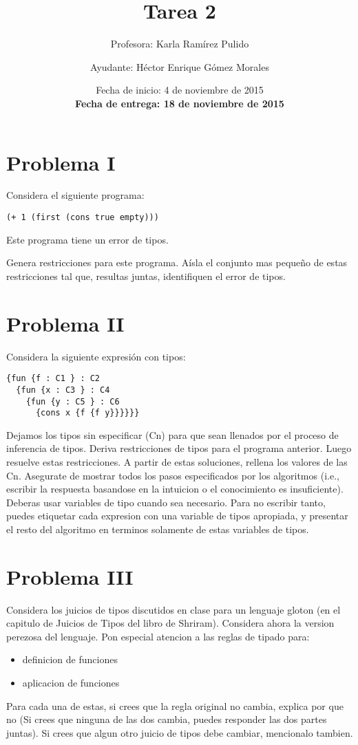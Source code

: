\documentclass{article}
\author{Profesora: Karla Ramírez Pulido \and
  Ayudante: Héctor Enrique Gómez Morales}
\title{Tarea 2}
\date{Fecha de inicio: 4 de noviembre de 2015\\
  \textbf{Fecha de entrega: 18 de noviembre de 2015}}
\begin{document}
\maketitle
\section*{Problema I}
Considera el siguiente programa:

\begin{verbatim}
(+ 1 (first (cons true empty)))
\end{verbatim}

Este programa tiene un error de tipos.

Genera restricciones para este programa. Aísla el conjunto mas pequeño de
estas restricciones tal que, resultas juntas, identifiquen el error de tipos.

\section*{Problema II}
Considera la siguiente expresión con tipos:

\begin{verbatim}
{fun {f : C1 } : C2
  {fun {x : C3 } : C4
    {fun {y : C5 } : C6
      {cons x {f {f y}}}}}}
\end{verbatim}

Dejamos los tipos sin especificar (Cn) para que sean llenados por el proceso
de inferencia de tipos. Deriva restricciones de tipos para el programa anterior.
Luego resuelve estas restricciones. A partir de estas soluciones, rellena los
valores de las Cn. Asegurate de mostrar todos los pasos especificados por los
algoritmos (i.e., escribir la respuesta basandose en la intuicion o el conocimiento
es insuficiente). Deberas usar variables de tipo cuando sea necesario.
Para no escribir tanto, puedes etiquetar cada expresion con una variable de tipos
apropiada, y presentar el resto del algoritmo en terminos solamente de estas
variables de tipos.

\section*{Problema III}
Considera los juicios de tipos discutidos en clase para un lenguaje gloton (en el capitulo de Juicios de Tipos del libro de Shriram). Considera ahora la version perezosa
del lenguaje. Pon especial atencion a las reglas de tipado para:

\begin{itemize}
\item definicion de funciones
\item aplicacion de funciones
\end{itemize}

Para cada una de estas, si crees que la regla original no cambia, explica por que no
(Si crees que ninguna de las dos cambia, puedes responder las dos partes juntas).
Si crees que algun otro juicio de tipos debe cambiar, mencionalo tambien.
\end{document}

